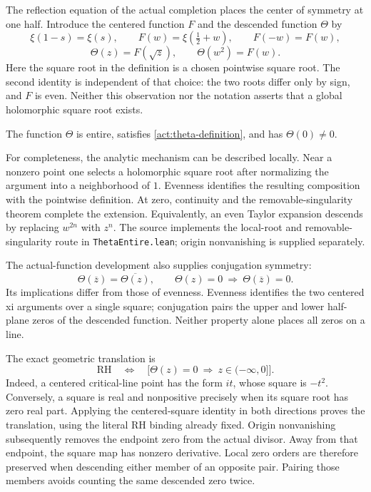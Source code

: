 \label{act:descent}
The reflection equation of the actual completion places the center of
symmetry at one half. Introduce the centered function $F$ and the descended
function $\Theta$ by
\begin{equation}
 \xi(1-s)=\xi(s),\qquad F(w)=\xi(\tfrac12+w),\qquad F(-w)=F(w),
\end{equation}
\begin{equation}\label{act:theta-definition}
 \Theta(z)=F(\sqrt z),\qquad \Theta(w^2)=F(w).
\end{equation}
Here the square root in the definition is a chosen pointwise square root.
The second identity is independent of that choice: the two roots differ
only by sign, and $F$ is even. Neither this observation nor the notation
asserts that a global holomorphic square root exists.

\begin{proposition}\label{act:theta-entire}
The function $\Theta$ is entire, satisfies
\eqref{act:theta-definition}, and has $\Theta(0)\ne0$.
\end{proposition}
For completeness, the analytic mechanism can be described locally. Near
a nonzero point one selects a holomorphic square root after normalizing
the argument into a neighborhood of $1$. Evenness identifies the resulting
composition with the pointwise definition. At zero, continuity and the
removable-singularity theorem complete the extension. Equivalently, an
even Taylor expansion descends by replacing $w^{2n}$ with $z^n$.
The source implements the local-root and removable-singularity route in
\texttt{ThetaEntire.lean}; origin nonvanishing is supplied separately.

The actual-function development also supplies conjugation symmetry:
\begin{equation}\label{act:theta-conjugation}
 \Theta(\overline z)=\overline{\Theta(z)},\qquad
 \Theta(z)=0\ \Longrightarrow\ \Theta(\overline z)=0.
\end{equation}
Its implications differ from those of evenness. Evenness identifies the
two centered xi arguments over a single square; conjugation pairs the
upper and lower half-plane zeros of the descended function. Neither
property alone places all zeros on a line.

The exact geometric translation is
\begin{equation}\label{act:theta-rh}
 \mathrm{RH}\quad\Longleftrightarrow\quad
 \bigl[\Theta(z)=0\ \Longrightarrow\ z\in(-\infty,0]\bigr].
\end{equation}
Indeed, a centered critical-line point has the form $it$, whose square
is $-t^2$. Conversely, a square is real and nonpositive precisely when
its square root has zero real part. Applying the centered-square identity
in both directions proves the translation, using the literal RH binding
already fixed. Origin nonvanishing subsequently removes the endpoint zero
from the actual divisor.
Away from that endpoint, the square map has nonzero derivative. Local
zero orders are therefore preserved when descending either member of
an opposite pair. Pairing those members avoids counting the same
descended zero twice.

